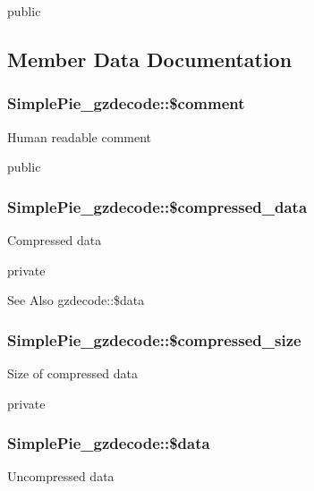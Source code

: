public 

\subsection{Member Data Documentation}
\hypertarget{class_simple_pie__gzdecode_ad00744e8cbcecada4304032c4fa07035}{
\subsubsection[{\$comment}]{\setlength{\rightskip}{0pt plus 5cm}Simple\-Pie\-\_\-gzdecode\-::\$comment}}\label{class_simple_pie__gzdecode_ad00744e8cbcecada4304032c4fa07035}
Human readable comment

public \hypertarget{class_simple_pie__gzdecode_a37971714e0afe3eff05baf66cf9fbbd6}{
\subsubsection[{\$compressed\-\_\-data}]{\setlength{\rightskip}{0pt plus 5cm}Simple\-Pie\-\_\-gzdecode\-::\$compressed\-\_\-data}}\label{class_simple_pie__gzdecode_a37971714e0afe3eff05baf66cf9fbbd6}
Compressed data

private \begin{DoxySeeAlso}{See Also}
gzdecode\-::\$data 
\end{DoxySeeAlso}
\hypertarget{class_simple_pie__gzdecode_ab7b6a04c74c0ccfe1b764f8df5c09b45}{
\subsubsection[{\$compressed\-\_\-size}]{\setlength{\rightskip}{0pt plus 5cm}Simple\-Pie\-\_\-gzdecode\-::\$compressed\-\_\-size}}\label{class_simple_pie__gzdecode_ab7b6a04c74c0ccfe1b764f8df5c09b45}
Size of compressed data

private \hypertarget{class_simple_pie__gzdecode_ac057ecbb30937a76b16a5defe1c975d4}{
\subsubsection[{\$data}]{\setlength{\rightskip}{0pt plus 5cm}Simple\-Pie\-\_\-gzdecode\-::\$data}}\label{class_simple_pie__gzdecode_ac057ecbb30937a76b16a5defe1c975d4}
Uncompressed data

